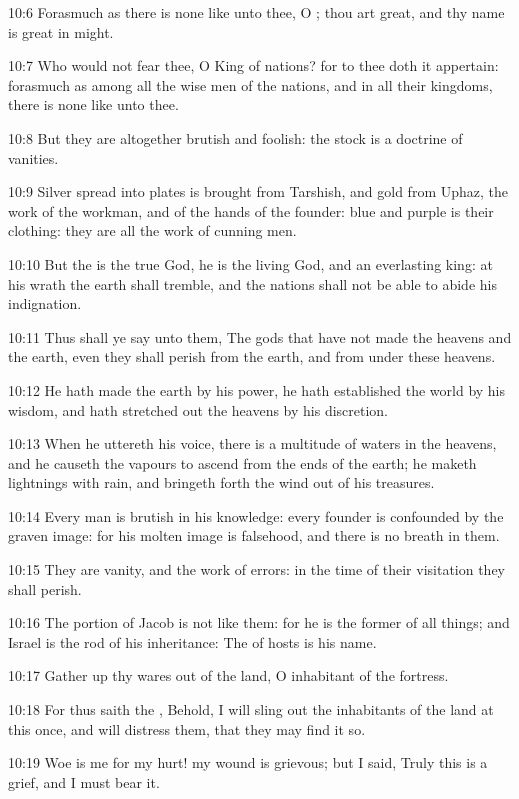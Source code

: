10:6 Forasmuch as there is none like unto thee, O \LORD; thou art
great, and thy name is great in might.

10:7 Who would not fear thee, O King of nations? for to thee doth it
appertain: forasmuch as among all the wise men of the nations, and in
all their kingdoms, there is none like unto thee.

10:8 But they are altogether brutish and foolish: the stock is a
doctrine of vanities.

10:9 Silver spread into plates is brought from Tarshish, and gold from
Uphaz, the work of the workman, and of the hands of the founder: blue
and purple is their clothing: they are all the work of cunning men.

10:10 But the \LORD is the true God, he is the living God, and an
everlasting king: at his wrath the earth shall tremble, and the
nations shall not be able to abide his indignation.

10:11 Thus shall ye say unto them, The gods that have not made the
heavens and the earth, even they shall perish from the earth, and from
under these heavens.

10:12 He hath made the earth by his power, he hath established the
world by his wisdom, and hath stretched out the heavens by his
discretion.

10:13 When he uttereth his voice, there is a multitude of waters in
the heavens, and he causeth the vapours to ascend from the ends of the
earth; he maketh lightnings with rain, and bringeth forth the wind out
of his treasures.

10:14 Every man is brutish in his knowledge: every founder is
confounded by the graven image: for his molten image is falsehood, and
there is no breath in them.

10:15 They are vanity, and the work of errors: in the time of their
visitation they shall perish.

10:16 The portion of Jacob is not like them: for he is the former of
all things; and Israel is the rod of his inheritance: The \LORD of
hosts is his name.

10:17 Gather up thy wares out of the land, O inhabitant of the
fortress.

10:18 For thus saith the \LORD, Behold, I will sling out the
inhabitants of the land at this once, and will distress them, that
they may find it so.

10:19 Woe is me for my hurt! my wound is grievous; but I said, Truly
this is a grief, and I must bear it.

